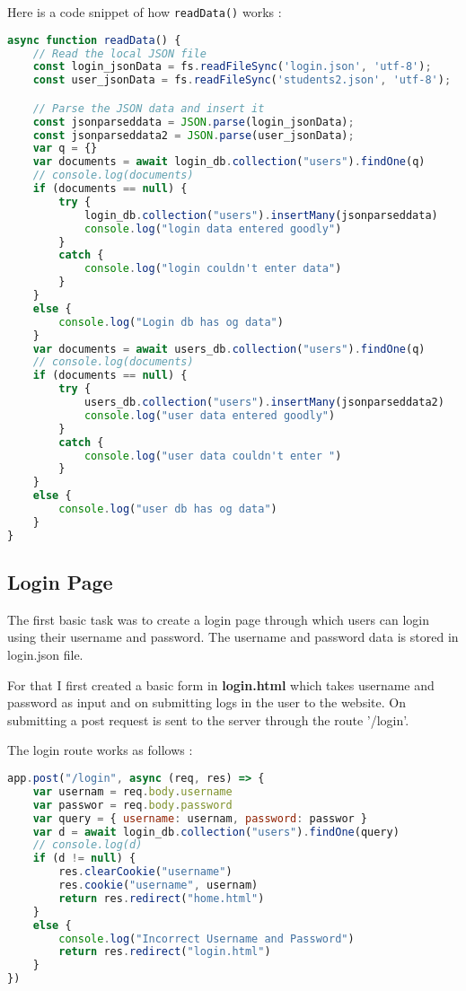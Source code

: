 \documentclass{article}
\begin{document}
Here is a code snippet of how \texttt{readData()} works :
\begin{lstlisting}[language=JavaScript]
    async function readData() {
    // Read the local JSON file
    const login_jsonData = fs.readFileSync('login.json', 'utf-8');
    const user_jsonData = fs.readFileSync('students2.json', 'utf-8');

    // Parse the JSON data and insert it
    const jsonparseddata = JSON.parse(login_jsonData);
    const jsonparseddata2 = JSON.parse(user_jsonData);
    var q = {}
    var documents = await login_db.collection("users").findOne(q)
    // console.log(documents)
    if (documents == null) {
        try {
            login_db.collection("users").insertMany(jsonparseddata)
            console.log("login data entered goodly")
        }
        catch {
            console.log("login couldn't enter data")
        }
    }
    else {
        console.log("Login db has og data")
    }
    var documents = await users_db.collection("users").findOne(q)
    // console.log(documents)
    if (documents == null) {
        try {
            users_db.collection("users").insertMany(jsonparseddata2)
            console.log("user data entered goodly")
        }
        catch {
            console.log("user data couldn't enter ")
        }
    }
    else {
        console.log("user db has og data")
    }
}
\end{lstlisting}
\subsection{Login Page}
The first basic task was to create a login page through which users can login using their username and password. The username and password data is stored in login.json file.

For that I first created a basic form in \textbf{login.html} which takes username and password as input and on submitting logs in the user to the website. On submitting a post request is sent to the server through the route '/login'.

The login route works as follows :
\begin{lstlisting}[language=JavaScript]
    app.post("/login", async (req, res) => {
    var usernam = req.body.username
    var passwor = req.body.password
    var query = { username: usernam, password: passwor }
    var d = await login_db.collection("users").findOne(query)
    // console.log(d)
    if (d != null) {
        res.clearCookie("username")
        res.cookie("username", usernam)
        return res.redirect("home.html")
    }
    else {
        console.log("Incorrect Username and Password")
        return res.redirect("login.html")
    }
})
\end{lstlisting}
\end{document}

